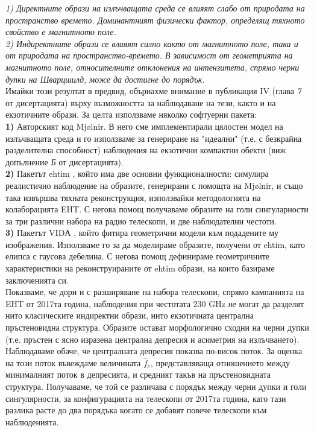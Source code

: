 \documentclass[12pt]{article}
\numberwithin{equation}{section}
\numberwithin{figure}{section}
\begin{document}
	\emph{1) Директните образи на излъчващата среда се влияят слабо от природата на пространство времето. Доминантният физически фактор, определящ тяхното свойство е магнитното поле.}\\
	
	\emph{2) Индиректните образи се влияят силно както от магнитното поле, така и от природата на пространство-времето. В зависимост от геометрията на магнитното поле, относителните отклонения на интензитета, спрямо черни дупки на Шварцшилд, може да достигне до порядък.}\\
	
	Имайки този резултат в предвид, обърнахме внимание в публикация IV (глава \emph{7} от дисертацията) върху възможността за наблюдаване на тези, както и на екзотичните образи. За целта използваме няколко софтуерни пакета:\\
	
	\textbf{1)} Авторският код Mjølnir. В него сме имплементирали цялостен модел на излъчващата среда и го използваме за генериране на "идеални" (т.е. с безкрайна разделителна способност) наблюдения на екзотични компактни обекти (виж допълнение \emph{Б} от дисертацията).\\
	
	\textbf{2)} Пакетът ehtim \cite{EHTIM}, който има две основни функционалности: симулира реалистично наблюдение на образите, генерирани с помощта на Mjølnir, и също така извършва тяхната реконструкция, използвайки методологията на колаборацията EHT. С негова помощ получаваме образите на голи сингуларности за три различни набора на радио телескопи, и две наблюдателни честоти.\\
	
	\textbf{3)} Пакетът VIDА \cite{VIDA}, който фитира геометрични модели към подадените му изображения. Използваме го за да моделираме образите, получени от ehtim, като елипса с гаусова дебелина. С негова помощ дефинираме геометричните характеристики на реконструираните от ehtim образи, на които базираме заключенията си.\\
	
	Показваме, че дори и с разширяване на набора телескопи, спрямо кампанията на EHT от 2017та година, наблюдения при честотата $230$ GHz \emph{не} могат да разделят нито класическите индиректни образи, нито екзотичната централна пръстеновидна структура. Образите остават морфологично сходни на черни дупки (т.е. пръстен с ясно изразена централна депресия и асиметрия на излъчването). Наблюдаваме обаче, че централната депресия показва по-висок поток. За оценка на този поток въвеждаме величината $\hat{f}_c$, представляваща отношението между минималният поток в депресията, и средният такъв на пръстеновидната структура. Получаваме, че той се различава с порядък между черни дупки и голи сингулярности, за конфигурацията на телескопи от 2017та година, като тази разлика расте до два порядъка когато се добавят повече телескопи към наблюденията.\\
	
\end{document}
